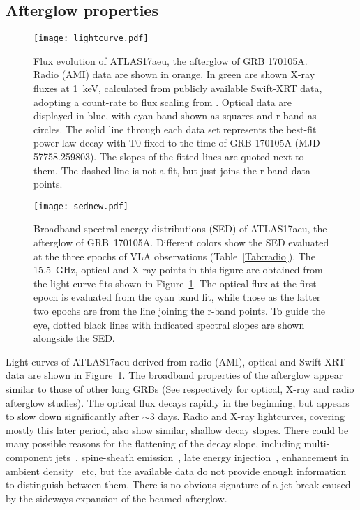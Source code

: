 \documentclass[twocolumn]{aastex6}
\begin{document}
\subsection{Afterglow properties}


\begin{figure}[!bth]
\texttt{[image: lightcurve.pdf]}
\caption{Flux evolution of ATLAS17aeu, the afterglow of GRB 170105A. Radio (AMI) data are shown in orange. In green are shown X-ray fluxes at 1~keV, calculated from publicly available Swift-XRT data, adopting a count-rate to flux scaling from \citet{GW170104_SwiftXRT2}. Optical data are displayed in blue, with cyan band shown as squares and r-band as circles. The solid line through each data set represents the best-fit power-law decay with T0 fixed to the time of GRB 170105A (MJD 57758.259803).  The slopes of the fitted lines are quoted next to them.  The dashed line is not a fit, but just joins the r-band data points.}
\label{fig:allflux}
\end{figure}

\begin{figure}[hbt]
\texttt{[image: sednew.pdf]}
\caption{Broadband spectral energy distributions (SED) of ATLAS17aeu, the afterglow of GRB~170105A. Different colors show the SED evaluated at the three epochs of VLA observations (Table~\ref{Tab:radio}). The 15.5~GHz, optical and X-ray points in this figure are obtained from the light curve fits shown in Figure~\ref{fig:allflux}. The optical flux at the first epoch is evaluated from the cyan band fit, while those as the latter two epochs are from the line joining the r-band points.  To guide the eye, dotted black lines with indicated spectral slopes are shown alongside the SED.}
\label{fig:sed}
\end{figure}

Light curves of ATLAS17aeu derived from radio (AMI), optical and Swift 
XRT data are shown in Figure~\ref{fig:allflux}. The broadband properties of the afterglow appear similar to those of other long GRBs (See \citealt{kkz+11,ebp+09,cf12} respectively for optical, X-ray and radio afterglow studies). The optical flux decays 
rapidly in the beginning, but appears to slow down significantly after 
$\sim 3$ days.  Radio and X-ray lightcurves, covering mostly this later 
period, also show similar, shallow decay slopes.  There could be many 
possible reasons for the flattening of the decay slope, including 
multi-component jets~\citep{berger+03}, spine-sheath emission~\citep{ramirez-ruiz+02}, late energy injection~\citep{zhang+02}, 
enhancement in ambient density~\citep{geng+14} etc, but the available data do not 
provide enough information to distinguish between them. There is no obvious 
signature of a jet break \citep{rhoads99} caused by the 
sideways expansion of the beamed afterglow.
\end{document}
